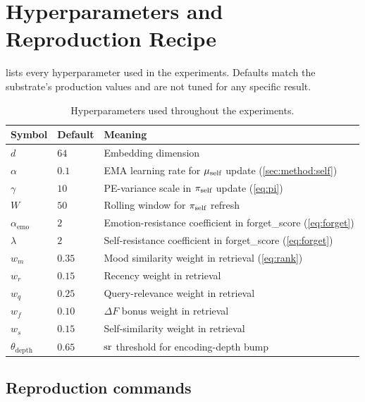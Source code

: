 \section{Hyperparameters and Reproduction Recipe}
\label{app:hparams}

 lists every hyperparameter used in the experiments.
Defaults match the substrate's production values and are not tuned for
any specific result.

\begin{table}[h]
\centering\small
\caption{Hyperparameters used throughout the experiments.}
\label{tab:hparams}
\begin{tabular}{lll}
\toprule
Symbol & Default & Meaning \\
\midrule
$d$       & $64$  & Embedding dimension \\
$\alpha$  & $0.1$ & EMA learning rate for $\mu_{\text{self}}$ update (\cref{sec:method:self}) \\
$\gamma$  & $10$  & PE-variance scale in $\pi_{\text{self}}$ update (\cref{eq:pi}) \\
$W$       & $50$  & Rolling window for $\pi_{\text{self}}$ refresh \\
$\alpha_{\text{emo}}$ & $2$ & Emotion-resistance coefficient in forget\_score (\cref{eq:forget}) \\
$\lambda$ & $2$   & Self-resistance coefficient in forget\_score (\cref{eq:forget}) \\
$w_m$     & $0.35$ & Mood similarity weight in retrieval (\cref{eq:rank}) \\
$w_r$     & $0.15$ & Recency weight in retrieval \\
$w_q$     & $0.25$ & Query-relevance weight in retrieval \\
$w_f$     & $0.10$ & $\Delta F$ bonus weight in retrieval \\
$w_s$     & $0.15$ & Self-similarity weight in retrieval \\
$\theta_{\text{depth}}$ & $0.65$ & $\mathrm{sr}$ threshold for encoding-depth bump \\
\bottomrule
\end{tabular}
\end{table}

\subsection*{Reproduction commands}

